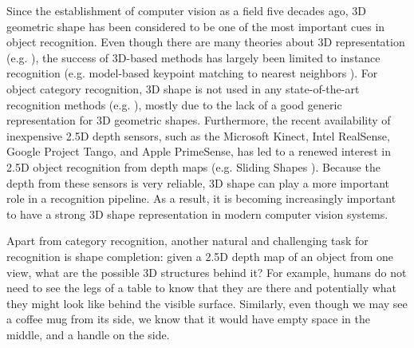 \documentclass[10pt,twocolumn,letterpaper]{article}
\begin{document}
Since the establishment of computer vision as a field five decades ago,
3D geometric shape has been considered to be one of the most important cues in object recognition.
Even though there are many theories about 3D representation (e.g. \cite{geon,GeometricEra}),
the success of 3D-based methods has largely been limited to instance recognition
(e.g. 
model-based 
keypoint matching to nearest neighbors \cite{rothganger20063d,tang2012textured}).
For object category recognition, 3D shape is not used in any state-of-the-art recognition methods (e.g. \cite{DPM,DCNN}),
mostly due to the lack of a good generic representation for 3D geometric shapes.
Furthermore, the recent availability of inexpensive 2.5D depth sensors,
such as the Microsoft Kinect, Intel RealSense, Google Project Tango, and Apple PrimeSense,
has led to a renewed interest in 2.5D object recognition from depth maps (e.g. Sliding Shapes \cite{SlidingShapes}).
Because the depth from these sensors is very reliable, 3D shape can play a more important role in a recognition pipeline.
As a result, it is becoming increasingly important to have a strong 3D shape representation in modern computer vision systems.

Apart from category recognition,
another natural and challenging task for recognition is shape completion:
given a 2.5D depth map of an object from one view, what are the possible 3D structures behind it? For example, humans do not need to see the legs of a table to know that they are there and potentially what they might look like behind the visible surface. Similarly, even though we may see a coffee mug from its side, we know that it would have empty space in the middle, and a handle on the side. 


\iffalse
On the other hand, 
object recognition is sometimes quite difficult, even for humans.
It is possible that we cannot confidently recognize an object from a particular viewpoint and we have to resolve to another view to gather more observation for recognizing an object. 
This situation is even more common for computer vision.
Automatic object recognition systems today fail frequently \cite{Failures}, and we desire a robust system that can recover from errors automatically.
In particular, as shown in Figure \ref{fig:ShapeNets},
if a robot cannot identify an object confidently from a given view, 
a fail-safe mode is to allow the robot to move and observe the object from another viewpoint, in order to reduce the uncertainty for recognition.
This naturally raises the question for view planning: which next view is the best for helping the robot to discriminate the object category?
\fi
\end{document}
